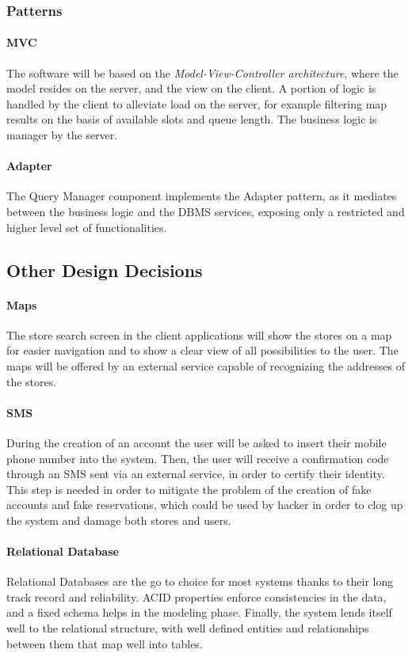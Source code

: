 \subsubsection{Patterns}

\paragraph{MVC} The software will be based on the \emph{Model-View-Controller architecture}, where the model resides on the server, and the view on the client. A portion of logic is handled by the client to alleviate load on the server, for example filtering map results on the basis of available slots and queue length. The business logic is manager by the server.

\paragraph{Adapter}
The Query Manager component implements the Adapter pattern, as it mediates between the business logic and the DBMS services, exposing only a restricted and higher level set of functionalities.

\subsection{Other Design Decisions}

\paragraph{Maps}
The store search screen in the client applications will show the stores on a map for easier navigation and to show a clear view of all possibilities to the user. The maps will be offered by an external service capable of recognizing the addresses of the stores.

\paragraph{SMS}
During the creation of an account the user will be asked to insert their mobile phone number into the system. Then, the user will receive a confirmation code through an SMS sent via an external service, in order to certify their identity. This step is needed in order to mitigate the problem of the creation of fake accounts and fake reservations, which could be used by hacker in order to clog up the system and damage both stores and users.

\paragraph{Relational Database}
Relational Databases are the go to choice for most systems thanks to their long track record and reliability. ACID properties enforce consistencies in the data, and a fixed schema helps in the modeling phase. Finally, the system lends itself well to the relational structure, with well defined entities and relationships between them that map well into tables. 
